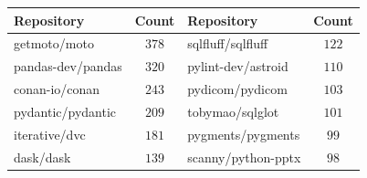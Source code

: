     \centering
    \begin{tabular}{lc|lc}
\toprule
Repository & Count & Repository & Count \\
\midrule
\scriptsize getmoto/moto & $378$ & \scriptsize sqlfluff/sqlfluff & $122$ \\
\scriptsize pandas-dev/pandas & $320$ & \scriptsize pylint-dev/astroid & $110$ \\
\scriptsize conan-io/conan & $243$ & \scriptsize pydicom/pydicom & $103$ \\
\scriptsize pydantic/pydantic & $209$ & \scriptsize tobymao/sqlglot & $101$ \\
\scriptsize iterative/dvc & $181$ & \scriptsize pygments/pygments & $99$ \\
\scriptsize dask/dask & $139$ & \scriptsize scanny/python-pptx & $98$ \\
\bottomrule
    \end{tabular}
    \caption{
Top ten repositories by number of trajectories represented in final dataset for main result.
    }
    \label{tab:sft_final_repos}
